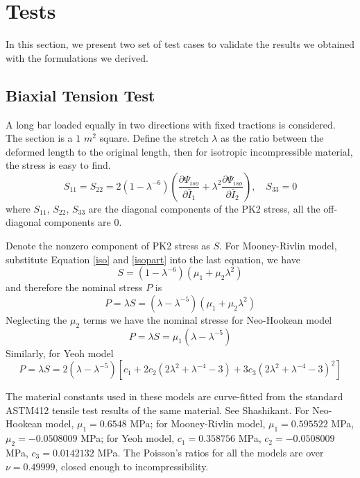 \section{Tests}
In this section, we present two set of test cases to validate the results we obtained with the formulations we derived.
\subsection{Biaxial Tension Test}
A long bar loaded equally in two directions with fixed tractions is considered. The section is a $1$ $m^2$ square. Define the stretch $\lambda$ as the ratio between the deformed length to the original length, then for isotropic incompressible material, the stress is easy to find.
\begin{equation}
S_{11} = S_{22} = 2(1 - {\lambda}^{-6})(\frac{\partial\Psi_{iso}}{\partial\bar{I}_1} + {\lambda}^2\frac{\partial\Psi_{iso}}{\partial\bar{I}_2}), \quad S_{33} = 0
\end{equation}
where $S_{11}$, $S_{22}$, $S_{33}$ are the diagonal components of the PK2 stress, all the off-diagonal components are $0$.

Denote the nonzero component of PK2 stress as $S$. For Mooney-Rivlin model, substitute Equation \ref{iso} and \ref{isopart} into the last equation, we have
\begin{equation}
S = (1 - {\lambda}^{-6})(\mu_1 + \mu_2{\lambda}^2)
\end{equation}
and therefore the nominal stress $P$ is
\begin{equation}
P = \lambda S =  (\lambda - {\lambda}^{-5})(\mu_1 + \mu_2{\lambda}^2)
\end{equation}
Neglecting the $\mu_2$ terms we have the nominal stresse for Neo-Hookean model
\begin{equation}
P = \lambda S =  \mu_1(\lambda - {\lambda}^{-5})
\end{equation}
Similarly, for Yeoh model
\begin{equation}
P = \lambda S = 2(\lambda - {\lambda}^{-5})[c_1 + 2c_2(2{\lambda}^2 + {\lambda}^{-4} - 3) + 3c_3(2{\lambda}^2 + {\lambda}^{-4} - 3)^2]
\end{equation}

The material constants used in these models are curve-fitted from the standard ASTM412 tensile test results of the same material. See Shashikant. For Neo-Hookean model, $\mu_1 = 0.6548$ MPa; for Mooney-Rivlin model, $\mu_1 = 0.595522$ MPa, $\mu_2 = -0.0508009$ MPa; for Yeoh model, $c_1 = 0.358756$ MPa, $c_2 = - 0.0508009$ MPa, $c_3 = 0.0142132$ MPa. The Poisson's ratios for all the models are over $\nu = 0.49999$, closed enough to incompressibility.

